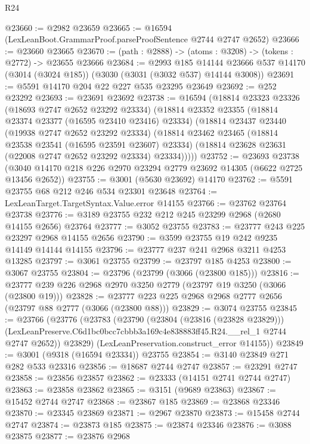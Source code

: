 \begin{lexlean}{R24}
\begin{coremodule}
@23660 := @2982 @23659
@23665 := @16594 (LexLeanBoot.GrammarProof.parseProofSentence @2744 @2747 @2652)
@23666 := @23660 @23665
@23670 := (path : @2888) -> (atoms : @3208) -> (tokens : @2772) -> @23655 @23666
@23684 := @2993
    @185
    @14144
    @23666
    @537
    @14170
    (@3014 (@3024 @185))
    (@3030 (@3031 (@3032 @537) @14144 @3008))
@23691 := @5591 @14170 @204 @22 @227 @535 @23295 @23649
@23692 := @252 @23292
@23693 := @23691 @23692
@23738 := @16594
    (@18814
      @23323
      @23326
      (@18693 @2747 @2652 @23292 @23334)
      (@18814
        @23352
        @23355
        (@18814 @23374 @23377 (@16595 @23410 @23416) @23334)
        (@18814
          @23437
          @23440
          (@19938 @2747 @2652 @23292 @23334)
          (@18814
            @23462
            @23465
            (@18814 @23538 @23541 (@16595 @23591 @23607) @23334)
            (@18814 @23628 @23631 (@22008 @2747 @2652 @23292 @23334) @23334)))))
@23752 := @23693
    @23738
    (@3040 @14170 @218 @226 @2970 @23294 @2779 @23692 @14305 (@6622 @2725 @13456 @2652))
@23755 := @3001 (@5630 @23692) @14170
@23762 := @5591 @23755 @68 @212 @246 @534 @23301 @23648
@23764 := LexLeanTarget.TargetSyntax.Value.error @14155
@23766 := @23762 @23764 @23738
@23776 := @3189 @23755 @232 @212 @245 @23299 @2968 (@2680 @14155 @2656) @23764
@23777 := @3052 @23755
@23783 := @23777 @243 @225 @23297 @2968 @14155 @2656
@23790 := @3599 @23755 @19 @242 @9235 @14149 @14144 @14155
@23796 := @23777 @237 @241 @2968 @3211 @4253 @13285
@23797 := @3061 @23755
@23799 := @23797 @185 @4253
@23800 := @3067 @23755
@23804 := @23796 (@23799 (@3066 (@23800 @185)))
@23816 := @23777 @239 @226 @2968 @2970 @3250 @2779 (@23797 @19 @3250 (@3066 (@23800 @19)))
@23828 := @23777 @223 @225 @2968 @2968 @2777 @2656 (@23797 @88 @2777 (@3066 (@23800 @88)))
@23829 := @3074 @23755
@23845 := @23766
    (@23776
      (@23783
        (@23790
          (@23804 (@23816 (@23828 @23829)))
          (LexLeanPreserve.C6d1bc0bcc7cbbb3a169c4e838883ff45.R24.__rel_1 @2744 @2747 @2652))
        @23829)
      (LexLeanPreservation.construct_error @14155))
@23849 := @3001 (@9318 (@16594 @23334)) @23755
@23854 := @3140 @23849 @271 @282 @533 @23316
@23856 := @18687 @2744 @2747
@23857 := @23291 @2747
@23858 := @23856 @23857
@23862 := @23333 (@14151 @2741 @2744 @2747)
@23863 := @23858 @23862
@23865 := @3151 (@9689 @23863)
@23867 := @15452 @2744 @2747
@23868 := @23867 @185
@23869 := @23868 @23346
@23870 := @23345 @23869
@23871 := @2967 @23870
@23873 := @15458 @2744 @2747
@23874 := @23873 @185
@23875 := @23874 @23346
@23876 := @3088 @23875
@23877 := @23876 @2968

\end{coremodule}
\end{lexlean}
